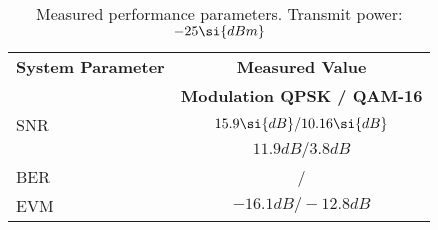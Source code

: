 \begin{table}[htbp]
  \centering
  \caption{Measured performance parameters. Transmit power: $\measPWRbad \si{dBm}$}
    \begin{tabular}{lc}
    \rowcolor[rgb]{ 0,  0,  0} \textcolor[rgb]{ 1,  1,  1}{\textbf{System Parameter}}	& \textcolor[rgb]{ 1,  1,  1}{\textbf{Measured Value}} 		\\
    \rowcolor[rgb]{ 0,  0,  0} \textcolor[rgb]{ 1,  1,  1}{} & \textcolor[rgb]{ 1,  1,  1}{\textbf{Modulation QPSK / QAM-16}}					\\

    	SNR 													& $\measSNRQPSKBad\si{dB} / \measSNRQAMBad\si{dB}$					\\
	\ebnot 													& $11.9\si{dB} / 3.8\si{dB}$								\\    	
	BER			 											& \measBERQPSKBad / \measBERQAMBad		\\
	EVM 													& $-16.1\si{dB} / -12.8\si{dB}$								\\

 \end{tabular}
  \label{tab:meas_params_bad}
\end{table}